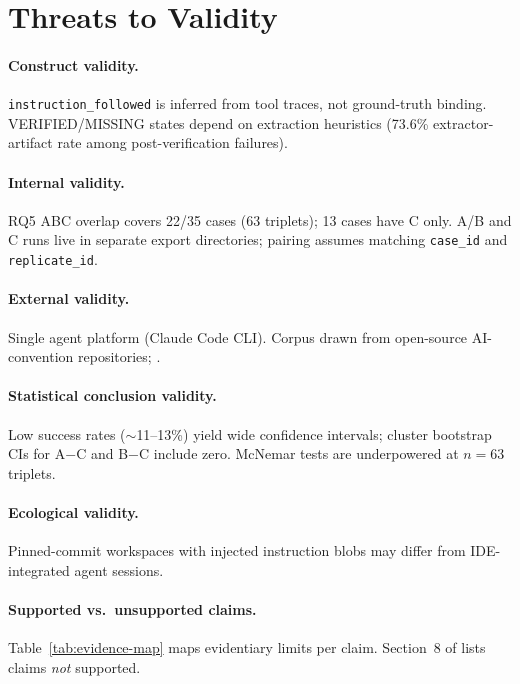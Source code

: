 \section{Threats to Validity}
\label{sec:threats}

\paragraph{Construct validity.}
\texttt{instruction\_followed} is inferred from tool traces, not ground-truth binding.
VERIFIED/MISSING states depend on extraction heuristics (73.6\% extractor-artifact rate among post-verification failures).

\paragraph{Internal validity.}
RQ5 ABC overlap covers 22/35 cases (63 triplets); 13 cases have C only.
A/B and C runs live in separate export directories; pairing assumes matching \texttt{case\_id} and \texttt{replicate\_id}.

\paragraph{External validity.}
Single agent platform (Claude Code CLI).
Corpus drawn from open-source AI-convention repositories; .

\paragraph{Statistical conclusion validity.}
Low success rates ($\sim$11--13\%) yield wide confidence intervals; cluster bootstrap CIs for A$-$C and B$-$C include zero.
McNemar tests are underpowered at $n=63$ triplets.

\paragraph{Ecological validity.}
Pinned-commit workspaces with injected instruction blobs may differ from IDE-integrated agent sessions.

\paragraph{Supported vs.\ unsupported claims.}
Table~\ref{tab:evidence-map} maps evidentiary limits per claim.
Section~8 of  lists claims \emph{not} supported.
